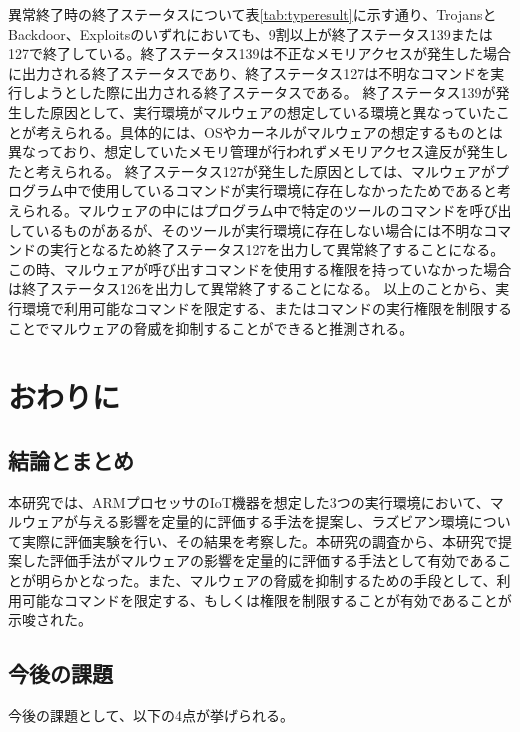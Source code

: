 \documentclass[12pt,a4paper,titlepage,report]{jsbook}
\begin{document}
異常終了時の終了ステータスについて表\ref{tab:typeresult}に示す通り、TrojansとBackdoor、Exploitsのいずれにおいても、9割以上が終了ステータス139または127で終了している。終了ステータス139は不正なメモリアクセスが発生した場合に出力される終了ステータスであり、終了ステータス127は不明なコマンドを実行しようとした際に出力される終了ステータスである。
終了ステータス139が発生した原因として、実行環境がマルウェアの想定している環境と異なっていたことが考えられる。具体的には、OSやカーネルがマルウェアの想定するものとは異なっており、想定していたメモリ管理が行われずメモリアクセス違反が発生したと考えられる。
終了ステータス127が発生した原因としては、マルウェアがプログラム中で使用しているコマンドが実行環境に存在しなかったためであると考えられる。マルウェアの中にはプログラム中で特定のツールのコマンドを呼び出しているものがあるが、そのツールが実行環境に存在しない場合には不明なコマンドの実行となるため終了ステータス127を出力して異常終了することになる。この時、マルウェアが呼び出すコマンドを使用する権限を持っていなかった場合は終了ステータス126を出力して異常終了することになる。
以上のことから、実行環境で利用可能なコマンドを限定する、またはコマンドの実行権限を制限することでマルウェアの脅威を抑制することができると推測される。





\chapter{おわりに}
\section{結論とまとめ}
本研究では、ARMプロセッサのIoT機器を想定した3つの実行環境において、マルウェアが与える影響を定量的に評価する手法を提案し、ラズビアン環境について実際に評価実験を行い、その結果を考察した。本研究の調査から、本研究で提案した評価手法がマルウェアの影響を定量的に評価する手法として有効であることが明らかとなった。また、マルウェアの脅威を抑制するための手段として、利用可能なコマンドを限定する、もしくは権限を制限することが有効であることが示唆された。

\section{今後の課題}
今後の課題として、以下の4点が挙げられる。
\end{document}
